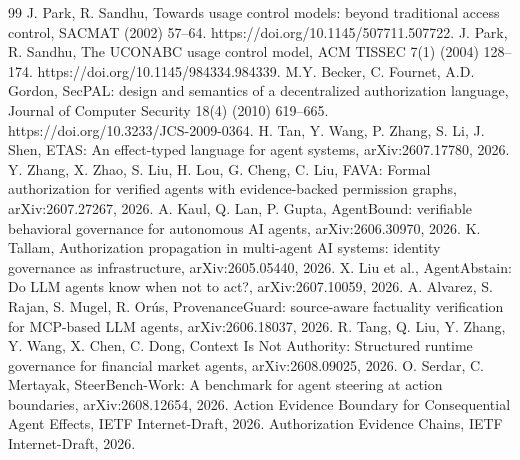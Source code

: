 \documentclass[11pt]{article}
\begin{document}
\begin{thebibliography}{99}
 J. Park, R. Sandhu, Towards usage control models: beyond traditional access control, SACMAT (2002) 57--64. https://doi.org/10.1145/507711.507722.
 J. Park, R. Sandhu, The UCONABC usage control model, ACM TISSEC 7(1) (2004) 128--174. https://doi.org/10.1145/984334.984339.
 M.Y. Becker, C. Fournet, A.D. Gordon, SecPAL: design and semantics of a decentralized authorization language, Journal of Computer Security 18(4) (2010) 619--665. https://doi.org/10.3233/JCS-2009-0364.
 H. Tan, Y. Wang, P. Zhang, S. Li, J. Shen, ETAS: An effect-typed language for agent systems, arXiv:2607.17780, 2026.
 Y. Zhang, X. Zhao, S. Liu, H. Lou, G. Cheng, C. Liu, FAVA: Formal authorization for verified agents with evidence-backed permission graphs, arXiv:2607.27267, 2026.
 A. Kaul, Q. Lan, P. Gupta, AgentBound: verifiable behavioral governance for autonomous AI agents, arXiv:2606.30970, 2026.
 K. Tallam, Authorization propagation in multi-agent AI systems: identity governance as infrastructure, arXiv:2605.05440, 2026.
 X. Liu et al., AgentAbstain: Do LLM agents know when not to act?, arXiv:2607.10059, 2026.
 A. Alvarez, S. Rajan, S. Mugel, R. Or\'us, ProvenanceGuard: source-aware factuality verification for MCP-based LLM agents, arXiv:2606.18037, 2026.
 R. Tang, Q. Liu, Y. Zhang, Y. Wang, X. Chen, C. Dong, Context Is Not Authority: Structured runtime governance for financial market agents, arXiv:2608.09025, 2026.
 O. Serdar, C. Mertayak, SteerBench-Work: A benchmark for agent steering at action boundaries, arXiv:2608.12654, 2026.
 Action Evidence Boundary for Consequential Agent Effects, IETF Internet-Draft, 2026.
 Authorization Evidence Chains, IETF Internet-Draft, 2026.
\end{thebibliography}
\end{document}
